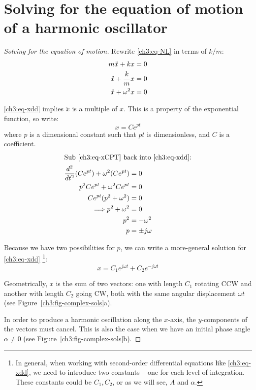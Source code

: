 \section{Solving for the equation of motion of a harmonic oscillator}

\begin{proof}[Solving for the equation of motion]
Rewrite \eqref{ch3:eq-NL} in terms of $k/m$:
\begin{align}
m\ddot{x} + kx &= 0 \notag\\
\ddot{x} + \frac{k}{m}x &= 0 \notag\\
\ddot{x} + \omega^2 x  &= 0 \label{ch3:eq-xdd}
\end{align}

\eqref{ch3:eq-xdd} implies $\ddot{x}$ is a multiple of $x$. This is a property of the exponential function, so write: 
\begin{equation}
	x=Ce^{pt} \label{ch3:eq-xCPT}
\end{equation}
where $p$ is a dimensional constant such that $pt$ is dimensionless, and $C$ is a coefficient.
%
\begin{align*}
\intertext{Sub \eqref{ch3:eq-xCPT} back into \eqref{ch3:eq-xdd}:}
\frac{d^2}{dt^2}(Ce^{pt})+\omega^2(Ce^{pt}) &= 0\\
p^2Ce^{pt}+\omega^2Ce^{pt}&=0 \\
Ce^{pt}(p^2+\omega^2) &=0 \\
\Longrightarrow p^2 + \omega^2 &= 0 \\
p^2 &= -\omega^2 \\
p &= \pm j\omega
\end{align*}

Because we have two possibilities for $p$, we can write a more-general solution for \eqref{ch3:eq-xdd}%
\footnote{In general, when working with second-order differential equations like \eqref{ch3:eq-xdd}, we need to introduce two constants -- one for each level of integration. These constants could be $C_1, C_2$, or as we will see, $A$ and $\alpha$.}:
\begin{equation}
	 x = C_1e^{j\omega t}+C_2e^{-j\omega t}	\label{ch3:eq-complex-general-sol}
\end{equation}

Geometrically, $x$ is the sum of two vectors: one with length $C_1$ rotating CCW and another with length $C_2$ going CW, both with the same angular displacement $\omega t$ (see Figure~\ref{ch3:fig-complex-sols}a).

In order to produce a harmonic oscillation along the $x$-axis, the $y$-components of the vectors must cancel. This is also the case when we have an initial phase angle $\alpha\neq 0$ (see Figure~\ref{ch3:fig-complex-sols}b).


\end{proof}
